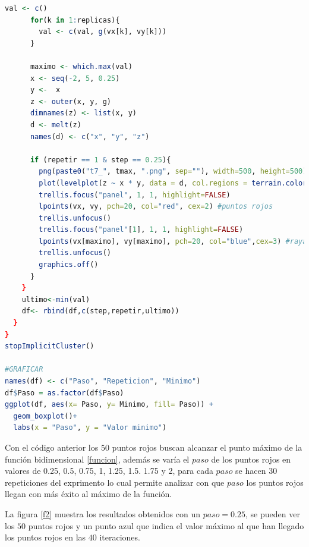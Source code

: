 \documentclass{article}
\begin{document}
\begin{lstlisting}[language=R, caption= Código objetivo de la práctica.]
      val <- c()
      for(k in 1:replicas){
        val <- c(val, g(vx[k], vy[k]))
      }
      
      maximo <- which.max(val)
      x <- seq(-2, 5, 0.25) 
      y <-  x
      z <- outer(x, y, g)
      dimnames(z) <- list(x, y)
      d <- melt(z)
      names(d) <- c("x", "y", "z")
      
      if (repetir == 1 & step == 0.25){
        png(paste0("t7_", tmax, ".png", sep=""), width=500, height=500)
        plot(levelplot(z ~ x * y, data = d, col.regions = terrain.colors(100)))
        trellis.focus("panel", 1, 1, highlight=FALSE)
        lpoints(vx, vy, pch=20, col="red", cex=2) #puntos rojos
        trellis.unfocus()
        trellis.focus("panel"[1], 1, 1, highlight=FALSE) 
        lpoints(vx[maximo], vy[maximo], pch=20, col="blue",cex=3) #raya azul
        trellis.unfocus()
        graphics.off()
      }
    }
    ultimo<-min(val)
    df<- rbind(df,c(step,repetir,ultimo))
  }
}
stopImplicitCluster()

#GRAFICAR
names(df) <- c("Paso", "Repeticion", "Minimo")
df$Paso = as.factor(df$Paso)
ggplot(df, aes(x= Paso, y= Minimo, fill= Paso)) + 
  geom_boxplot()+
  labs(x = "Paso", y = "Valor minimo")
\end{lstlisting}

Con el código anterior los $50$ puntos rojos buscan alcanzar el punto máximo de la función bidimensional \eqref{funcion}, además se varía el $paso$ de los puntos rojos en valores de 0.25, 0.5, 0.75, 1, 1.25, 1.5. 1.75 y 2, para cada $paso$ se hacen $30$ repeticiones del exprimento lo cual permite analizar con que $paso$ los puntos rojos llegan con más éxito al máximo de la función. 
\bigskip

La figura \ref{f2} muestra los resultados obtenidos con un $paso = 0.25$, se pueden ver los $50$ puntos rojos y un punto azul que indica el valor máximo al que han llegado los puntos rojos en las $40$ iteraciones.
\end{document}
